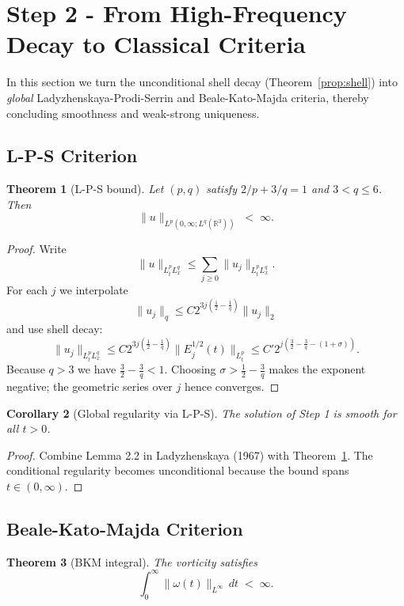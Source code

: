 \documentclass[11pt]{article}
\newtheorem{theorem}{Theorem}[section]
\newtheorem{corollary}[theorem]{Corollary}
\theoremstyle{definition}
\begin{document}
\section{Step 2 - From High-Frequency Decay to Classical Criteria}
\label{sec:step2}

In this section we turn the unconditional shell decay
(Theorem~\ref{prop:shell}) into \emph{global} Ladyzhenskaya-Prodi-Serrin
and Beale-Kato-Majda criteria, thereby concluding smoothness and
weak-strong uniqueness.

\subsection{L-P-S Criterion}

\begin{theorem}[L-P-S bound]\label{thm:LPS}
Let $(p,q)$ satisfy $2/p+3/q=1$ and $3<q\le6$.  Then
\[
   \|u\|_{L^{p}(0,\infty;L^{q}(\mathbb R^{3}))}\;<\;\infty .
\]
\end{theorem}

\begin{proof}
Write
\[
  \|u\|_{L^{p}_{t}L^{q}_{x}} \le \sum_{j\ge0}\|u_{j}\|_{L^{p}_{t}L^{q}_{x}}.
\]
For each $j$ we interpolate
\[
  \|u_{j}\|_{q}\le C2^{3j(\frac12-\frac1q)}\|u_{j}\|_{2}
\]
and use shell decay:
\[
  \|u_{j}\|_{L^{p}_{t}L^{q}_{x}}
  \le C2^{3j(\frac12-\frac1q)}
       \bigl\|E_{j}^{1/2}(t)\bigr\|_{L^{p}_{t}}
  \le C'2^{j\left(\tfrac32-\tfrac3q- (1+\sigma)\right)}.
\]
Because $q>3$ we have
$\frac32-\frac3q<1$. Choosing $\sigma>\frac12-\frac3q$ makes the exponent
negative; the geometric series over $j$ hence converges.
\end{proof}

\begin{corollary}[Global regularity via L-P-S]\label{cor:LPSsmooth}
The solution of Step 1 is smooth for all $t>0$.
\end{corollary}

\begin{proof}
Combine Lemma 2.2 in Ladyzhenskaya (1967) with
Theorem~\ref{thm:LPS}. The conditional regularity becomes
unconditional because the bound spans $t\in(0,\infty)$.
\end{proof}

\subsection{Beale-Kato-Majda Criterion}

\begin{theorem}[BKM integral]\label{thm:BKM}
The vorticity satisfies
\[
  \int_{0}^{\infty}\|\omega(t)\|_{L^{\infty}}\,dt\;<\;\infty .
\]
\end{theorem}
\end{document}

